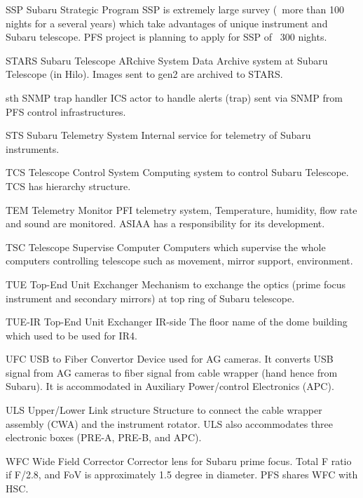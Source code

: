 {SSP}
{Subaru Strategic Program}
{SSP is extremely large survey (~more than 100 nights for a several years) which take advantages of unique instrument and Subaru telescope. PFS project is planning to apply for SSP of ~300 nights.}


{STARS}
{Subaru Telescope ARchive System}
{Data Archive system at Subaru Telescope (in Hilo). Images sent to gen2 are archived to STARS.}


{sth}
{SNMP trap handler}
{ICS actor to handle alerts (trap) sent via SNMP from PFS control infrastructures.}


{STS}
{Subaru Telemetry System}
{Internal service for telemetry of Subaru instruments.}


{TCS}
{Telescope Control System}
{Computing system to control Subaru Telescope. TCS has hierarchy structure.}


{TEM}
{Telemetry Monitor}
{PFI telemetry system, Temperature, humidity, flow rate and sound are monitored. ASIAA has a responsibility for its development.}


{TSC}
{Telescope Supervise Computer}
{Computers which supervise the whole computers controlling telescope such as movement, mirror support, environment.}


{TUE}
{Top-End Unit Exchanger}
{Mechanism to exchange the optics (prime focus instrument and secondary mirrors) at top ring of Subaru telescope.}


{TUE-IR}
{Top-End Unit Exchanger IR-side}
{The floor name of the dome building which used to be used for IR4.}


{UFC}
{USB to Fiber Convertor}
{Device used for AG cameras. It converts USB signal from AG cameras to fiber signal from cable wrapper (hand hence from Subaru). It is accommodated in Auxiliary Power/control Electronics (APC).}


{ULS}
{Upper/Lower Link structure}
{Structure to connect the cable wrapper assembly (CWA) and the instrument rotator. ULS also accommodates three electronic boxes (PRE-A, PRE-B, and APC).}


{WFC}
{Wide Field Corrector}
{Corrector lens for Subaru prime focus. Total F ratio if F/2.8, and FoV is approximately 1.5 degree in diameter. PFS shares WFC with HSC.}

